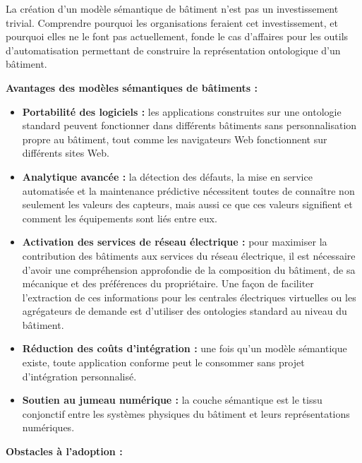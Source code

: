 La création d'un modèle sémantique de bâtiment n'est pas un investissement trivial.
Comprendre pourquoi les organisations feraient cet investissement, et pourquoi elles ne le font pas actuellement, fonde le cas d'affaires pour les outils d'automatisation permettant de construire la représentation ontologique d'un bâtiment.

\textbf{Avantages des modèles sémantiques de bâtiments :}

\begin{itemize}[leftmargin=*, itemsep=2pt]
  \item \textbf{Portabilité des logiciels :} les applications construites sur une ontologie standard peuvent fonctionner dans différents bâtiments sans personnalisation propre au bâtiment, tout comme les navigateurs Web fonctionnent sur différents sites Web.
  \item \textbf{Analytique avancée :} la détection des défauts, la mise en service automatisée et la maintenance prédictive nécessitent toutes de connaître non seulement les valeurs des capteurs, mais aussi ce que ces valeurs signifient et comment les équipements sont liés entre eux.
  \item \textbf{Activation des services de réseau électrique :} pour maximiser la contribution des bâtiments aux services du réseau électrique, il est nécessaire d'avoir une compréhension approfondie de la composition du bâtiment, de sa mécanique et des préférences du propriétaire.
  Une façon de faciliter l'extraction de ces informations pour les centrales électriques virtuelles ou les agrégateurs de demande est d'utiliser des ontologies standard au niveau du bâtiment.
  \item \textbf{Réduction des coûts d'intégration :} une fois qu'un modèle sémantique existe, toute application conforme peut le consommer sans projet d'intégration personnalisé.
  \item \textbf{Soutien au jumeau numérique :} la couche sémantique est le tissu conjonctif entre les systèmes physiques du bâtiment et leurs représentations numériques.
\end{itemize}

\textbf{Obstacles à l'adoption :}

